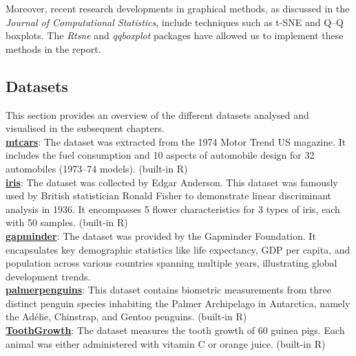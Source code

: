 \documentclass{article}\usepackage[]{graphicx}\usepackage[]{xcolor}
\numberwithin{equation}{section}
\begin{document}
\noindent Moreover, recent research developments in graphical methods, as discussed in the \textit{Journal of Computational Statistics}, include techniques such as t-SNE and Q–Q boxplots. The \textit{Rtsne} and \textit{qqboxplot} packages have allowed us to implement these methods in the report.\\ 
\newpage
\subsection{Datasets}
\noindent
This section provides an overview of the different datasets analysed and visualised in the subsequent chapters.\\

\noindent
\href{https://www.rdocumentation.org/packages/datasets/versions/3.6.2/topics/mtcars}{\textbf{mtcars}}: The dataset was extracted from the 1974 Motor Trend US magazine. It includes the fuel consumption and 10 aspects of automobile design for 32 automobiles (1973–74 models). \hfill (built-in R) \\

\noindent
\href{https://www.rdocumentation.org/packages/datasets/versions/3.6.2/topics/iris}{\textbf{iris}}: The dataset was collected by Edgar Anderson. This dataset was famously used by British statistician Ronald Fisher to demonstrate linear discriminant analysis in 1936. It encompasses 5 flower characteristics for 3 types of iris, each with 50 samples. \hfill (built-in R)\\

\noindent 
\href{https://www.gapminder.org/data/documentation/gd001/}{\textbf{gapminder}}: The dataset was provided by the Gapminder Foundation. It encapsulates key demographic statistics like life expectancy, GDP per capita, and population across various countries spanning multiple years, illustrating global development trends.\\

\noindent
\href{https://www.rdocumentation.org/packages/palmerpenguins/versions/0.1.1}{\textbf{palmerpenguins}}: This dataset contains biometric measurements from three distinct penguin species inhabiting the Palmer Archipelago in Antarctica, namely the Adélie, Chinstrap, and Gentoo penguins. \hfill (built-in R)\\

\noindent
\href{https://www.rdocumentation.org/packages/datasets/versions/3.6.2/topics/ToothGrowth}{\textbf{ToothGrowth}}: The dataset measures the tooth growth of 60 guinea pigs. Each animal was either administered with vitamin C or orange juice.  \hfill (built-in R)\\
\end{document}
